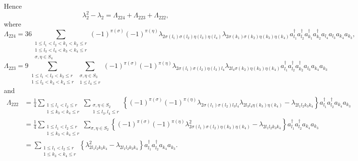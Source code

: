 \documentclass[aps,preprint]{revtex4}%
\begin{document}
Hence
\begin{equation}
\lambda_{2}^{2}-\lambda_{2}=\Lambda_{224}+\Lambda_{223}+\Lambda_{222},
\end{equation}
where
\begin{equation}
\Lambda_{224}=36\sum_{\substack{1\leq l_{1}<l_{2}<k_{1}<k_{2}\leq r\\1\leq
l_{3}<l_{4}<k_{3}<k_{4}\leq r\\\sigma,\eta\in S_{4}}}\left(  -1\right)
^{\pi\left(  \sigma\right)  }\left(  -1\right)  ^{\pi\left(  \eta\right)
}\lambda_{2\sigma\left(  l_{1}\right)  \sigma\left(  l_{2}\right)  \eta\left(
l_{3}\right)  \eta\left(  l_{4}\right)  }\lambda_{2\sigma\left(  k_{1}\right)
\sigma\left(  k_{2}\right)  \eta\left(  k_{3}\right)  \eta\left(
k_{4}\right)  }a_{l_{1}}^{\dagger}a_{l_{2}}^{\dagger}a_{k_{1}}^{\dagger
}a_{k_{2}}^{\dagger}a_{l_{4}}a_{l_{3}}a_{k_{4}}a_{k_{3}},
\end{equation}%
\begin{equation}
\Lambda_{223}=9\sum_{\substack{1\leq l_{1}<l_{2}<k_{2}\leq r\\1\leq
l_{3}<k_{3}<k_{4}\leq r}}\sum_{\substack{\sigma,\eta\in S_{3}\\1\leq l_{4}\leq
r}}\left(  -1\right)  ^{\pi\left(  \sigma\right)  }\left(  -1\right)
^{\pi\left(  \eta\right)  }\lambda_{2\sigma\left(  l_{1}\right)  \sigma\left(
l_{2}\right)  \eta\left(  l_{3}\right)  l_{4}}\lambda_{2l_{4}\sigma\left(
k_{2}\right)  \eta\left(  k_{3}\right)  \eta\left(  k_{4}\right)  }a_{l_{1}%
}^{\dagger}a_{l_{2}}^{\dagger}a_{k_{2}}^{\dagger}a_{l_{3}}a_{k_{4}}a_{k_{3}}%
\end{equation}
and
\begin{align}
\Lambda_{222}  &  =\frac{1}{4}\sum_{\substack{1\leq l_{1}<l_{2}\leq r\\1\leq
k_{3}<k_{4}\leq r}}\sum_{\substack{\sigma,\eta\in S_{2}\\1\leq l_{3},l_{4}\leq
r}}\left\{  \left(  -1\right)  ^{\pi\left(  \sigma\right)  }\left(  -1\right)
^{\pi\left(  \eta\right)  }\lambda_{2\sigma\left(  l_{1}\right)  \sigma\left(
l_{2}\right)  l_{3}l_{4}}\lambda_{2l_{3}l_{4}\eta\left(  k_{3}\right)
\eta\left(  k_{4}\right)  }-\lambda_{2l_{1}l_{2}k_{3}k_{4}}\right\}  a_{l_{1}%
}^{\dagger}a_{l_{2}}^{\dagger}a_{k_{4}}a_{k_{3}}\nonumber\\
&  =\frac{1}{4}\sum_{\substack{1\leq l_{1}<l_{2}\leq r\\1\leq k_{3}<k_{4}\leq
r}}\sum_{\sigma,\eta\in S_{2}}\left\{  \left(  -1\right)  ^{\pi\left(
\sigma\right)  }\left(  -1\right)  ^{\pi\left(  \eta\right)  }\lambda
_{2\sigma\left(  l_{1}\right)  \sigma\left(  l_{2}\right)  \eta\left(
k_{3}\right)  \eta\left(  k_{4}\right)  }^{2}-\lambda_{2l_{1}l_{2}k_{3}k_{4}%
}\right\}  a_{l_{1}}^{\dagger}a_{l_{2}}^{\dagger}a_{k_{4}}a_{k_{3}}\nonumber\\
&  =\sum_{\substack{1\leq l_{1}<l_{2}\leq r\\1\leq k_{3}<k_{4}\leq r}}\left\{
\lambda_{2l_{1}l_{2}k_{3}k_{4}}^{2}-\lambda_{2l_{1}l_{2}k_{3}k_{4}}\right\}
a_{l_{1}}^{\dagger}a_{l_{2}}^{\dagger}a_{k_{4}}a_{k_{3}}.
\end{align}
\end{document}

